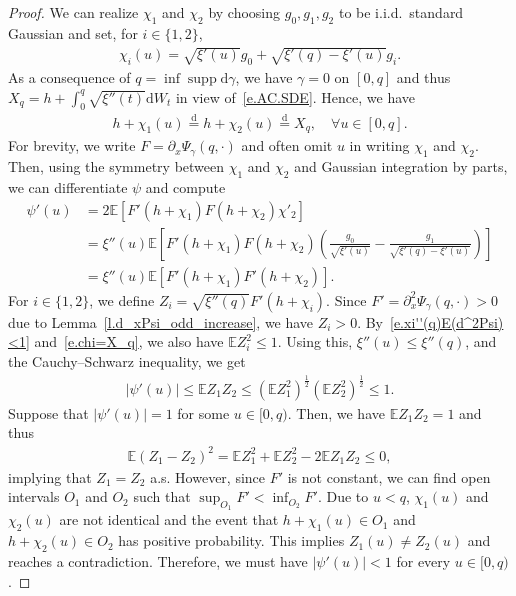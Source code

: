 \documentclass[11pt]{amsart}
\theoremstyle{remark}
\theoremstyle{definition}
\numberwithin{equation}{section}
\numberwithin{proposition}{section}
\numberwithin{figure}{section}
\numberwithin{table}{section}
\newcommand{\E}{\mathbb{E}}
\renewcommand{\leq}{\leqslant}
\newcommand{\Ll}{\left}
\newcommand{\Rr}{\right}
\renewcommand{\d}{\mathrm{d}}
\newcommand{\1}{\mathbf{1}}
\DeclareMathOperator{\supp}{supp}
\begin{document}
\begin{proof}
We can realize $\chi_1$ and $\chi_2$ by choosing $g_0,g_1,g_2$ to be i.i.d.\ standard Gaussian and set, for $i\in\{1,2\}$,
\begin{align*}
    \chi_i(u) = \sqrt{\xi'(u)}g_0 + \sqrt{\xi'(q)-\xi'(u)}g_i.
\end{align*}
As a consequence of $q=\inf\supp\d\gamma$, we have $\gamma=0$ on $[0,q]$ and thus $X_q = h+ \int_0^q\sqrt{\xi''(t)}\d W_t$ in view of~\eqref{e.AC.SDE}. Hence, we have
\begin{align}\label{e.chi=X_q}
    h+\chi_1(u)\stackrel{\d}{=}h+\chi_2(u)\stackrel{\d}{=}X_q,\quad\forall u\in[0,q].
\end{align}
For brevity, we write $F=\partial_x\Psi_\gamma(q,\cdot)$ and often omit $u$ in writing $\chi_1$ and $\chi_2$.
Then, using the symmetry between $\chi_1$ and $\chi_2$ and Gaussian integration by parts, we can differentiate $\psi$ and compute
\begin{align*}
    \psi'(u) &= 2\E \Ll[F'(h+\chi_1)F(h+\chi_2)\chi'_2\Rr]
    \\
    &= \xi''(u)\E \Ll[F'(h+\chi_1)F(h+\chi_2)\Ll(\tfrac{g_0}{\sqrt{\xi'(u)}}-\tfrac{g_1}{\sqrt{\xi'(q)-\xi'(u)}}\Rr)\Rr]
    \\
    & = \xi''(u)\E \Ll[F'(h+\chi_1)F'(h+\chi_2)\Rr].
\end{align*}
For $i\in\{1,2\}$, we define $Z_i = \sqrt{\xi''(q)}F'(h+\chi_i)$. Since $F'=\partial_x^2\Psi_\gamma(q,\cdot)>0$ due to Lemma~\ref{l.d_xPsi_odd_increase}, we have $Z_i>0$. By~\eqref{e.xi''(q)E(d^2Psi)<1} and~\eqref{e.chi=X_q}, we also have $\E Z_i^2\leq 1$. Using this, $\xi''(u)\leq \xi''(q)$, and the Cauchy--Schwarz inequality, we get
\begin{align*}
    |\psi'(u)|\leq \E Z_1Z_2\leq \Ll(\E Z_1^2\Rr)^\frac{1}{2}\Ll(\E Z_2^2\Rr)^\frac{1}{2}\leq 1.
\end{align*}
Suppose that $|\psi'(u)|=1$ for some $u\in[0,q)$. Then, we have $\E Z_1Z_2=1$ and thus 
\begin{align*}
    \E (Z_1-Z_2)^2 = \E Z_1^2 + \E Z_2^2 - 2 \E Z_1 Z_2 \leq 0,
\end{align*}
implying that $Z_1=Z_2$ a.s. However, since $F'$ is not constant, we can find open intervals $O_1$ and $O_2$ such that $\sup_{O_1} F' < \inf_{O_2} F'$. Due to $u<q$, $\chi_1(u)$ and $\chi_2(u)$ are not identical and the event that $h+\chi_1(u)\in O_1$ and $h+\chi_2(u)\in O_2$ has positive probability. This implies $Z_1(u)\neq Z_2(u)$ and reaches a contradiction. Therefore, we must have $|\psi'(u)|<1$ for every $u\in[0,q)$.
\end{proof}
\end{document}
